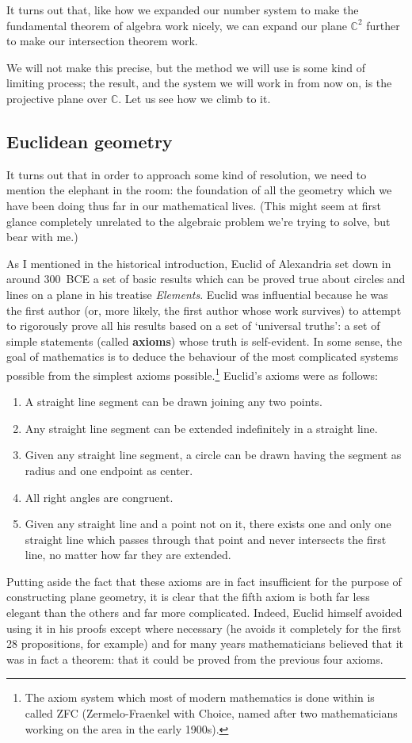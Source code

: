 \documentclass[a4paper,leqno,10pt]{article}
\theoremstyle{exercise}
\theoremstyle{plain}
\theoremstyle{definition}
\theoremstyle{remark}
\newcommand{\df}{\textbf}
\begin{document}
It turns out that, like how we expanded our number system to make the fundamental theorem of algebra work
nicely, we can expand our plane $ \mathbb{C}^2 $ further to make our intersection theorem work.

We will not make this precise, but the method we will use is some kind of limiting process; the result, and the
system we will work in from now on, is the projective plane over $ \mathbb{C} $. Let us see how we climb to it.

\subsection{Euclidean geometry}
It turns out that in order to approach some kind of resolution, we need to mention the elephant in the room: the
foundation of all the geometry which we have been doing thus far in our mathematical lives. (This might seem at first
glance completely unrelated to the algebraic problem we're trying to solve, but bear with me.)

As I mentioned in the historical introduction, Euclid of Alexandria set down in around 300~BCE a set of basic results
which can be proved true about circles and lines on a plane in his treatise \textit{Elements}.
Euclid was influential because he was the first author (or, more likely, the first author whose work survives) to
attempt to rigorously prove all his results based on a set of `universal truths': a set of simple statements (called
\df{axioms}) whose truth is self-evident. In some sense, the goal of mathematics is to deduce the behaviour of the
most complicated systems possible from the simplest axioms possible.\footnote{The axiom system which most of modern
mathematics is done within is called ZFC (Zermelo-Fraenkel with Choice, named after two mathematicians working on the
area in the early 1900s).} Euclid's axioms were as follows:
\begin{enumerate}
  \item A straight line segment can be drawn joining any two points.
  \item Any straight line segment can be extended indefinitely in a straight line.
  \item Given any straight line segment, a circle can be drawn having the segment as radius and one endpoint as center.
  \item All right angles are congruent.
  \item Given any straight line and a point not on it, there exists one and only one straight line which passes through
        that point and never intersects the first line, no matter how far they are extended.
\end{enumerate}
Putting aside the fact that these axioms are in fact insufficient for the purpose of constructing plane geometry, it is
clear that the fifth axiom is both far less elegant than the others and far more complicated. Indeed, Euclid himself avoided
using it in his proofs except where necessary (he avoids it completely for the first 28 propositions, for example) and for
many years mathematicians believed that it was in fact a theorem: that it could be proved from the previous four axioms.
\end{document}
